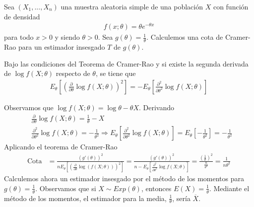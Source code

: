 \begin{ejemplo}
    Sea $(X_1,...,X_n)$ una muestra aleatoria simple de una población $X$ con función de densidad
    \begin{align*}
        f(x;\theta) = \theta e^{-\theta x}
    \end{align*}
    para todo $x > 0$ y siendo $\theta > 0$. Sea $g(\theta) = \frac{1}{\theta}$. Calculemos una cota de Cramer-Rao para un estimador insesgado $T$ de $g(\theta)$.
    \begin{obs}
        Bajo las condiciones del Teorema de Cramer-Rao y si existe la segunda derivada de $\log f(X;\theta)$ respecto de $\theta$, se tiene que
        \begin{align*}
            E_{\theta}\left[ \left( \frac{\partial}{\partial \theta} \log f(X;\theta)\right)^2\right] = - E_{\theta}\left[  \frac{\partial^2}{\partial \theta^2} \log f(X;\theta) \right]
        \end{align*}
    \end{obs}
    Observamos que $\log f(X;\theta) = \log \theta - \theta X$. Derivando
    \begin{align*}
         & \frac{\partial}{\partial \theta}\log f(X;\theta) = \frac{1}{\theta} - X                                                                                                                                                                          \\
         & \frac{\partial^2}{\partial \theta^2} \log f(X;\theta) = - \frac{1}{\theta^2} \Longrightarrow E_{\theta}\left[ \frac{\partial^2}{\partial \theta^2} \log f(X;\theta) \right] = E_{\theta}\left[ -\frac{1}{\theta^2}\right] =  -\frac{1}{\theta^2}
    \end{align*}
    Aplicando el teorema de Cramer-Rao
    \begin{align*}
        \text{Cota} & = \frac{(g'(\theta))^2}{nE_{\theta}\left[ \left( \frac{\partial}{\partial \theta}\log(f(X;\theta)) \right)^2\right]} = \frac{(g'(\theta))^2}{n- E_{\theta}\left[  \frac{\partial^2}{\partial \theta^2} \log f(X;\theta) \right]} =
        \frac{\left(\frac{1}{\theta} \right)^2}{\frac{n}{\theta^2}} = \frac{1}{n \theta^2}
    \end{align*}
    Calculemos ahora un estimador insesgado por el método de los momentos para $g(\theta) = \frac{1}{\theta}$. Observamos que si $X \sim Exp(\theta)$, entonces $E(X) = \frac{1}{\theta}$. Mediante el método de los momentos, el estimador para la media, $\frac{1}{\theta}$, sería $\overline{X}$.


\end{ejemplo}
